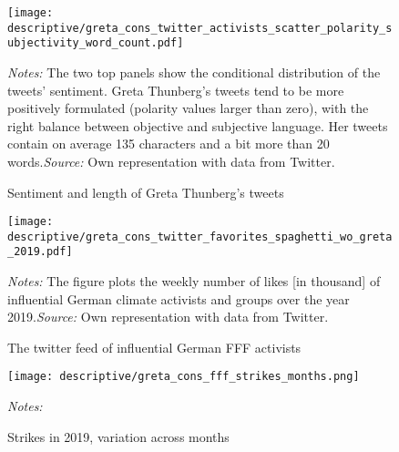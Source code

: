 \restoregeometry
\vspace*{\fill}
\begin{figure}[H]
	\centering\caption{Sentiment and length of Greta Thunberg's tweets}
	\label{fig_greta_cons:twitter_greta_sentiment_length}
	\texttt{[image: descriptive/greta\_cons\_twitter\_activists\_scatter\_polarity\_subjectivity\_word\_count.pdf]}
	\begin{minipage}{0.99\linewidth}
		\scriptsize{\emph{Notes:} The two top panels show the conditional distribution of the tweets' sentiment. Greta Thunberg's tweets tend to be more positively formulated (polarity values larger than zero), with the right balance between objective and subjective language. Her tweets contain on average 135 characters and a bit more than 20 words.\newline\emph{Source:} Own representation with data from Twitter.}
	\end{minipage}
\end{figure}
\vspace*{\fill}\clearpage
\vspace*{\fill}
\begin{figure}[H]
	\centering\caption{The twitter feed of influential German FFF activists}\label{fig_greta_cons:twitter_favorites_activists}
	\texttt{[image: descriptive/greta\_cons\_twitter\_favorites\_spaghetti\_wo\_greta\_2019.pdf]}
	\begin{minipage}{0.99\linewidth}
		\scriptsize{\emph{Notes:} The figure plots the weekly number of likes [in thousand] of influential German climate activists and groups over the year 2019.\newline\emph{Source:} Own representation with data from Twitter.}
	\end{minipage}
\end{figure}
\vspace*{\fill}\clearpage
\vspace*{\fill}
\begin{figure}[H]\centering
	\caption{Strikes in 2019, variation across months}\label{fig_greta_cons:fff_strikes_months}
	\texttt{[image: descriptive/greta\_cons\_fff\_strikes\_months.png]}
	\begin{minipage}{0.99\linewidth}
		\scriptsize{\emph{Notes:} }
	\end{minipage}
\end{figure}
\vspace*{\fill}\clearpage